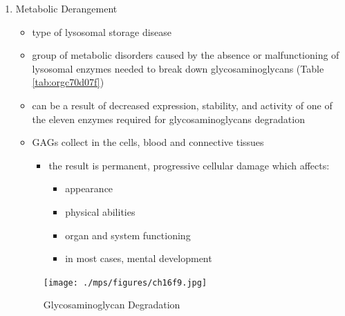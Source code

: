 \documentclass{scrartcl}
\begin{document}
\begin{enumerate}
\item Metabolic Derangement
\label{sec:orga149887}
\begin{itemize}
\item type of lysosomal storage disease
\item group of metabolic disorders caused by the absence or malfunctioning
of lysosomal enzymes needed to break down glycosaminoglycans (Table \ref{tab:orgc70d07f})
\item can be a result of decreased expression, stability, and activity of
one of the eleven enzymes required for glycosaminoglycans
degradation
\item GAGs collect in the cells, blood and connective tissues
\begin{itemize}
\item the result is permanent, progressive cellular damage which affects:
\begin{itemize}
\item appearance
\item physical abilities
\item organ and system functioning
\item in most cases, mental development
\end{itemize}
\end{itemize}
\end{itemize}

\begin{figure}[htbp]
\centering
\texttt{[image: ./mps/figures/ch16f9.jpg]}
\caption[Glycosaminoglycan Degradation]{\label{fig:org2182e3e}
Glycosaminoglycan Degradation}
\end{figure}


\end{enumerate}
\end{document}
